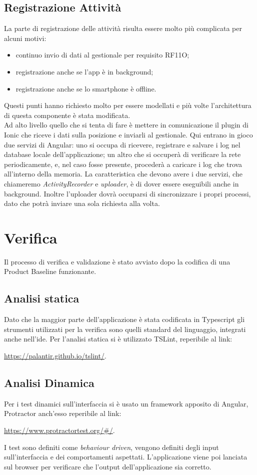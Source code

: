 \subsection{Registrazione Attività}
La parte di registrazione delle attività risulta essere molto più complicata per alcuni motivi:
\begin{itemize}
  \item continuo invio di dati al gestionale per requisito RF11O;
  \item registrazione anche se l'app è in background;
  \item registrazione anche se lo smartphone è offline.
\end{itemize}
Questi punti hanno richiesto molto per essere modellati e più volte l'architettura di questa componente è stata modificata. \\
\noindent Ad alto livello quello che si tenta di fare è mettere in comunicazione il plugin di Ionic che riceve i dati sulla posizione e inviarli al
gestionale. Qui entrano in gioco due servizi di Angular: uno si occupa di ricevere, registrare e salvare i log nel database locale
dell'applicazione; un altro che si occuperà di verificare la rete periodicamente, e, nel caso fosse presente, procederà a caricare i log che
trova all'interno della memoria. La caratteristica che devono avere i due servizi, che chiameremo \textit{ActivityRecorder} e \textit{uploader}, è di dover
essere eseguibili anche in background. Inoltre l'uploader dovrà occuparsi di sincronizzare i propri processi, dato che potrà inviare una
sola richiesta alla volta. 

\section{Verifica}
Il processo di verifica e validazione è stato avviato dopo la codifica di una \gls{Product Baseline} funzionante. 
\subsection{Analisi statica}
Dato che la maggior parte dell'applicazione è stata codificata in Typescript gli strumenti utilizzati per la verifica sono quelli standard
del linguaggio, integrati anche nell'\gls{ide}. Per l'analisi statica si è utilizzato TSLint, reperibile al link: \\
\begin{center}
  \url{https://palantir.github.io/tslint/}.
\end{center}
\subsection{Analisi Dinamica}
Per i test dinamici sull'interfaccia si è usato un framework apposito di Angular, Protractor anch'esso reperibile al link: \\
\begin{center}
  \url{https://www.protractortest.org/#/}.
\end{center}
I test sono definiti come \textit{behaviour driven}, vengono definiti degli input sull'interfaccia e dei comportamenti aspettati.
L'applicazione viene poi lanciata sul browser per verificare che l'output dell'applicazione sia corretto.

